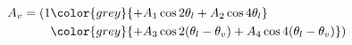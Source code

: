 \begin{align}
  A_v=(1&\color{grey}{+ A_1\cos 2\theta_l + A_2\cos 4\theta_l } \\
                       & \color{grey}{+A_3\cos 2(\theta_l-\theta_v) + A_4\cos 4(\theta_l-\theta_v)})
\end{align}
